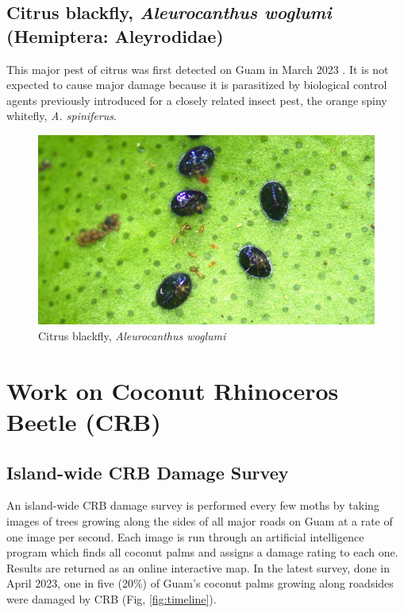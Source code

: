 \documentclass[twocolumn]{scrartcl}
\begin{document}
\subsection{Citrus blackfly, \textit{Aleurocanthus woglumi} (Hemiptera: Aleyrodidae)}

This major pest of citrus was first detected on Guam in March 2023 \cite{moore2023}. It is not expected to cause major damage because it is parasitized by biological control agents previously introduced for a closely related insect pest, the orange spiny whitefly, \textit{A. spiniferus}.

\begin{figure}[H]
	\centering
	\includegraphics[width=\linewidth]{images/woglumi}
	\caption{Citrus blackfly, \textit{Aleurocanthus woglumi}}
	\label{fig:woglumi}
\end{figure}


\section{Work on Coconut Rhinoceros Beetle (CRB)}

\subsection{Island-wide CRB Damage Survey}

An island-wide CRB damage survey is performed every few moths by taking images of trees growing along the sides of all major roads on Guam at a rate of one image per second. Each image is run through an artificial intelligence program which finds all coconut palms and assigns a damage rating to each one. Results are returned as an online interactive map. In the latest survey, done in April 2023, one in five (20\%) of Guam's coconut palms growing along roadsides were damaged by CRB \cite{moorePressRelease2023} (Fig, \ref{fig:timeline}).
\end{document}
